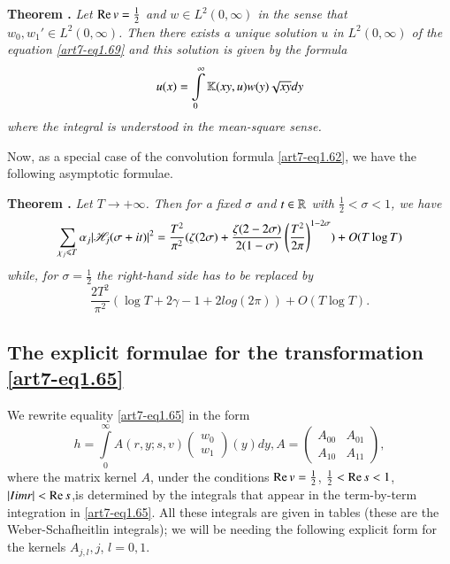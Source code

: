 \medskip
\noindent
{\bfseries Theorem .\label{art7-thm10}}
\textit{Let $\operatorname{Re} v =\frac{1}{2}$ and $w \in L^2 (0,\infty)$ in the sense that $w_0, w_1'\in L^2 (0,\infty)$. Then there exists a unique solution $u$ in $L^2 (0,\infty)$ of the equation \eqref{art7-eq1.69} and this solution is given by the formula}
\begin{equation}
u(x) = \int\limits^\infty_0 \mathbb{K} (xy, u) w(y) \sqrt{xy} dy \label{art7-1.70}
\end{equation}
\textit{where the integral is understood in the mean-square sense.}

Now, as a special case of the convolution formula \eqref{art7-eq1.62}, we have the following asymptotic formulae.

\medskip
\noindent
{\bfseries Theorem .\label{art7-thm11}}
\textit{Let $T \to + \infty$. Then for a fixed $\sigma$ and $t \in \mathbb{R}$ with $\frac{1}{2} < \sigma < 1$, we have}
\begin{equation}
\sum\limits_{\chi_j \leqslant T} \alpha_j |\mathscr{H}_j (\sigma +it)|^2 =\frac{T^2}{\pi^2} (\zeta (2\sigma) + \frac{\zeta(2-2\sigma)}{2(1-\sigma)} \left(\frac{T^2}{2\pi} \right)^{1-2\sigma} ) + O(T\log T)  \label{art7-eq1.71}
\end{equation}
\textit{while, for $\sigma =\frac{1}{2}$ the right-hand side has to be replaced by}
\begin{equation}
\frac{2T^2}{\pi^2} (\log T +2 \gamma - 1 +  2 log (2\pi)) + O(T \log T). \label{art7-eq1.72}
\end{equation}

\subsection{The explicit formulae for the transformation \eqref{art7-eq1.65}}\label{art7-eq1.12}

We rewrite equality \eqref{art7-eq1.65} in the form
\begin{equation}
h = \int\limits^\infty_0 A(r, y; s, v)
\begin{pmatrix}
w_0 \\
w_1
\end{pmatrix} 
(y) dy, A = 
\begin{pmatrix}
A_{00} & A_{01}\\
A_{10} & A_{11}
\end{pmatrix},  \label{art7-eq1.73}
\end{equation}
where the matrix kernel $A$, under the conditions $\operatorname{Re} v = \frac{1}{2}$, $\frac{1}{2} < \operatorname{Re} s < 1$, $|Iim r| < \operatorname{Re} s$,\pageoriginale is determined by the integrals that appear in the term-by-term integration in \eqref{art7-eq1.65}. All these integrals are given in tables (these are the Weber-Schafheitlin integrals); we will be needing the following explicit form for the kernels $A_{j,l}, j$, $l=0,1$.

